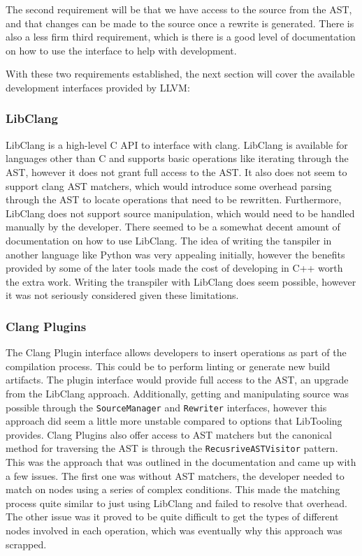 The second requirement will be that we have access to the source from the AST, and that changes can be made to the source once a rewrite is generated. There is also a less firm third requirement, which is there is a good level of documentation on how to use the interface to help with development.

With these two requirements established, the next section will cover the available development interfaces provided by LLVM:

\subsubsection{LibClang} 

LibClang is a high-level C API to interface with clang. LibClang is available for languages other than C and supports basic operations like iterating through the AST, however it does not grant full access to the AST. It also does not seem to support clang AST matchers, which would introduce some overhead parsing through the AST to locate operations that need to be rewritten. Furthermore, LibClang does not support source manipulation, which would need to be handled manually by the developer. There seemed to be a somewhat decent amount of documentation on how to use LibClang. The idea of writing the tanspiler in another language like Python was very appealing initially, however the benefits provided by some of the later tools made the cost of developing in C++ worth the extra work. Writing the transpiler with LibClang does seem possible, however it was not seriously considered given these limitations.

\subsubsection{Clang Plugins}

The Clang Plugin interface allows developers to insert operations as part of the compilation process. This could be to perform linting or generate new build artifacts. The plugin interface would provide full access to the AST, an upgrade from the LibClang approach. Additionally, getting and manipulating source was possible through the \texttt{SourceManager} and \texttt{Rewriter} interfaces, however this approach did seem a little more unstable compared to options that LibTooling provides. Clang Plugins also offer access to AST matchers but the canonical method for traversing the AST is through the \texttt{RecusriveASTVisitor} pattern. This was the approach that was outlined in the documentation and came up with a few issues. The first one was without AST matchers, the developer needed to match on nodes using a series of complex conditions. This made the matching process quite similar to just using LibClang and failed to resolve that overhead. The other issue was it proved to be quite difficult to get the types of different nodes involved in each operation, which was eventually why this approach was scrapped.


